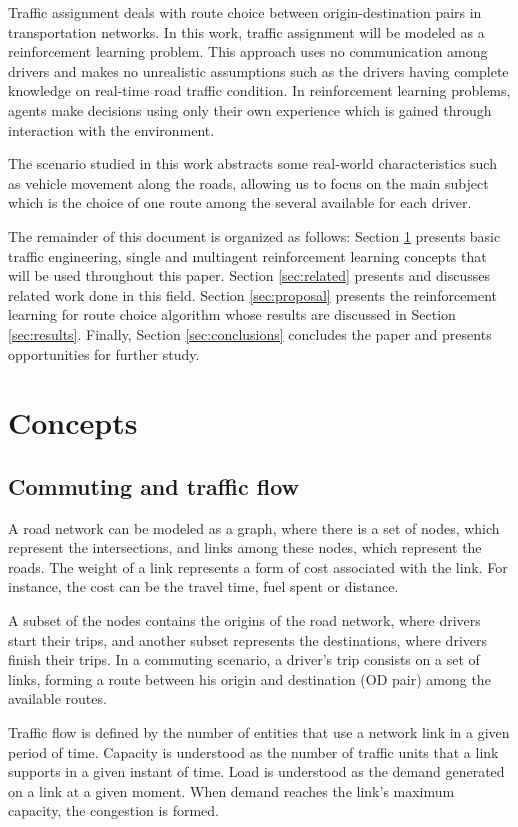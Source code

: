 \documentclass[12pt]{llncs}
\begin{document}
Traffic assignment deals with route choice between origin-destination pairs in transportation networks. In this work, traffic assignment will be modeled as a reinforcement learning problem. This approach uses no communication among drivers and makes no unrealistic assumptions such as the drivers having complete knowledge on real-time road traffic condition. In reinforcement learning problems, agents make decisions using only their own experience which is gained through interaction with the environment.

The scenario studied in this work abstracts some real-world characteristics such as vehicle movement along the roads, allowing us to focus on the main subject which is the choice of one route among the several available for each driver.

The remainder of this document is organized as follows: Section \ref{sec:concepts} presents basic traffic engineering, single and multiagent reinforcement learning concepts that will be used throughout this paper. Section \ref{sec:related} presents and discusses related work done in this field. Section \ref{sec:proposal} presents the reinforcement learning for route choice algorithm whose results are discussed in Section \ref{sec:results}. Finally, Section \ref{sec:conclusions} concludes the paper and presents opportunities for further study.

\section{Concepts}
\label{sec:concepts}
\subsection{Commuting and traffic flow}

A road network can be modeled as a graph, where there is a set of nodes, which represent the intersections, and links among these nodes, which represent the roads. The weight of a link represents a form of cost associated with the link. For instance, the cost can be the travel time, fuel spent or distance.

A subset of the nodes contains the origins of the road network, where drivers start their trips, and another subset represents the destinations, where drivers finish their trips. In a commuting scenario, a driver's trip consists on a set of links, forming a route between his origin and destination (OD pair) among the available routes.

Traffic flow is defined by the number of entities that use a network link in a given period of time. Capacity is understood as the number of traffic units that a link supports in a given instant of time. Load is understood as the demand generated on a link at a given moment. When demand reaches the link's maximum capacity, the congestion is formed.
\end{document}

